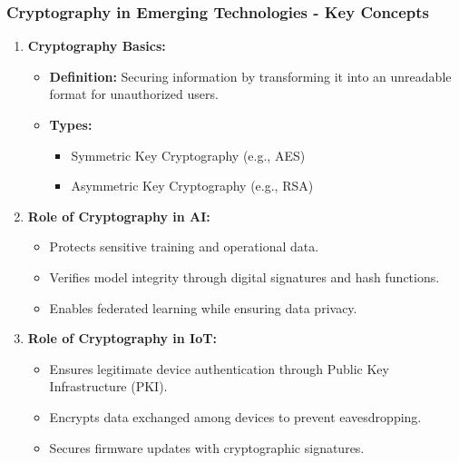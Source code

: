 \documentclass{beamer}
\begin{document}
\begin{frame}[fragile]
    \frametitle{Cryptography in Emerging Technologies - Key Concepts}
    \begin{enumerate}
        \item \textbf{Cryptography Basics:}
            \begin{itemize}
                \item \textbf{Definition:} Securing information by transforming it into an unreadable format for unauthorized users.
                \item \textbf{Types:}
                    \begin{itemize}
                        \item Symmetric Key Cryptography (e.g., AES)
                        \item Asymmetric Key Cryptography (e.g., RSA)
                    \end{itemize}
            \end{itemize}
        \item \textbf{Role of Cryptography in AI:}
            \begin{itemize}
                \item Protects sensitive training and operational data.
                \item Verifies model integrity through digital signatures and hash functions.
                \item Enables federated learning while ensuring data privacy.
            \end{itemize}
        \item \textbf{Role of Cryptography in IoT:}
            \begin{itemize}
                \item Ensures legitimate device authentication through Public Key Infrastructure (PKI).
                \item Encrypts data exchanged among devices to prevent eavesdropping.
                \item Secures firmware updates with cryptographic signatures.
            \end{itemize}
    \end{enumerate}
\end{frame}
\end{document}
